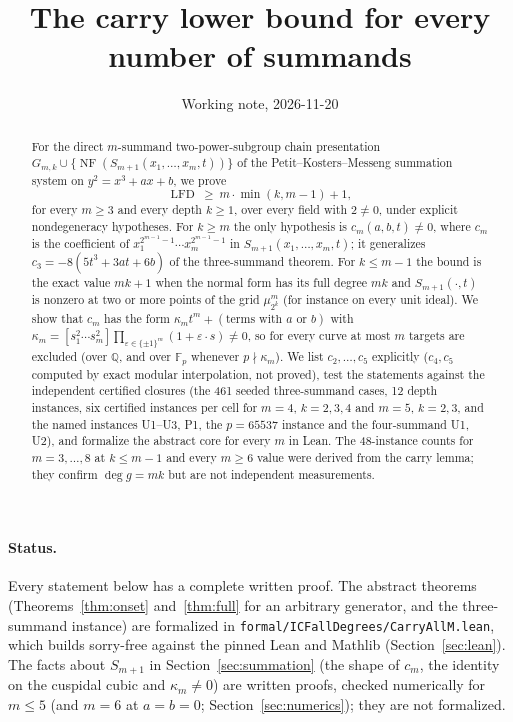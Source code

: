 \documentclass[11pt]{article}
\title{The carry lower bound for every number of summands}
\date{Working note, 2026-11-20}
\newcommand{\F}{\mathbb F}
\newcommand{\Q}{\mathbb Q}
\newcommand{\lfd}{\operatorname{LFD}}
\newcommand{\NF}{\operatorname{NF}}
\newcommand{\code}[1]{\texttt{#1}}
\theoremstyle{definition}
\theoremstyle{remark}
\begin{document}
\sloppy
\maketitle

\begin{abstract}
For the direct $m$-summand two-power-subgroup chain presentation
$G_{m,k}\cup\{\NF(S_{m+1}(x_1,\ldots,x_m,t))\}$ of the
Petit--Kosters--Messeng summation system on $y^2=x^3+ax+b$, we prove
\[
 \lfd\ \ge\ m\cdot\min(k,m-1)+1 ,
\]
for every $m\ge3$ and every depth $k\ge1$, over every field with $2\ne0$,
under explicit nondegeneracy hypotheses. For $k\ge m$ the only hypothesis
is $c_m(a,b,t)\ne0$, where $c_m$ is the coefficient of
$x_1^{2^{m-1}-1}\cdots x_m^{2^{m-1}-1}$ in $S_{m+1}(x_1,\ldots,x_m,t)$; it
generalizes $c_3=-8(5t^3+3at+6b)$ of the three-summand theorem. For
$k\le m-1$ the bound is the exact value $mk+1$ when the normal form has its
full degree $mk$ and $S_{m+1}(\cdot,t)$ is nonzero at two or more points
of the grid $\mu_{2^k}^m$ (for instance on every unit ideal). We show that $c_m$ has the form
$\kappa_m t^m+(\text{terms with }a\text{ or }b)$ with
$\kappa_m=[s_1^2\cdots s_m^2]\prod_{\varepsilon\in\{\pm1\}^m}(1+\varepsilon\cdot
s)\ne0$, so for every curve at most $m$ targets are excluded (over $\Q$, and
over $\F_p$ whenever $p\nmid\kappa_m$). We list
$c_2,\ldots,c_5$ explicitly ($c_4,c_5$ computed by exact modular
interpolation, not proved), test the statements against the independent
certified closures (the 461 seeded three-summand cases, 12 depth instances,
six certified instances per cell for $m=4$, $k=2,3,4$ and $m=5$, $k=2,3$, and
the named instances U1--U3, P1, the $p=65537$ instance and the four-summand
U1, U2), and formalize the abstract core for every $m$ in Lean. The
48-instance counts for $m=3,\ldots,8$ at $k\le m-1$ and every $m\ge6$ value
were derived from the carry lemma; they confirm $\deg g=mk$ but are not
independent measurements.
\end{abstract}

\paragraph{Status.} Every statement below has a complete written proof.
The abstract theorems (Theorems~\ref{thm:onset} and~\ref{thm:full} for an
arbitrary generator, and the three-summand instance) are formalized in
\code{formal/ICFallDegrees/CarryAllM.lean}, which builds sorry-free against the pinned
Lean and Mathlib (Section~\ref{sec:lean}). The facts about $S_{m+1}$ in
Section~\ref{sec:summation} (the shape of $c_m$, the identity on the
cuspidal cubic and $\kappa_m\ne0$) are written proofs, checked numerically
for $m\le5$ (and $m=6$ at $a=b=0$; Section~\ref{sec:numerics}); they are not
formalized.
\end{document}
